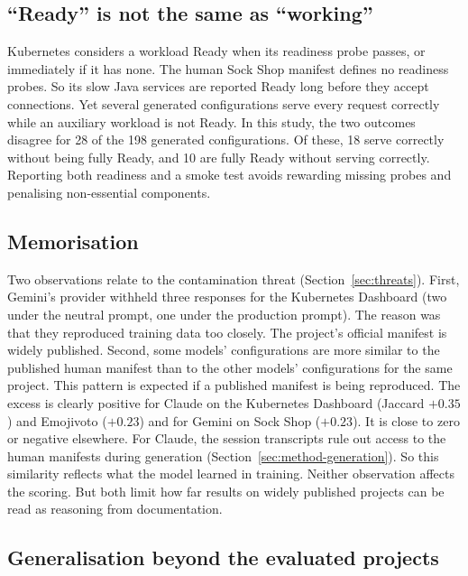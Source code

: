 \subsection{``Ready'' is not the same as ``working''}\label{sec:disc-ready}

Kubernetes considers a workload Ready when its readiness probe passes, or immediately if it has none. The human Sock Shop manifest defines no readiness probes. So its slow Java services are reported Ready long before they accept connections. Yet several generated configurations serve every request correctly while an auxiliary workload is not Ready. In this study, the two outcomes disagree for 28 of the 198 generated configurations. Of these, 18 serve correctly without being fully Ready, and 10 are fully Ready without serving correctly. Reporting both readiness and a smoke test avoids rewarding missing probes and penalising non-essential components.

\subsection{Memorisation}\label{sec:disc-memorisation}

Two observations relate to the contamination threat (Section~\ref{sec:threats}). First, Gemini's provider withheld three responses for the Kubernetes Dashboard (two under the neutral prompt, one under the production prompt). The reason was that they reproduced training data too closely. The project's official manifest is widely published. Second, some models' configurations are more similar to the published human manifest than to the other models' configurations for the same project. This pattern is expected if a published manifest is being reproduced. The excess is clearly positive for Claude on the Kubernetes Dashboard (Jaccard $+0.35$) and Emojivoto ($+0.23$) and for Gemini on Sock Shop ($+0.23$). It is close to zero or negative elsewhere. For Claude, the session transcripts rule out access to the human manifests during generation (Section~\ref{sec:method-generation}). So this similarity reflects what the model learned in training. Neither observation affects the scoring. But both limit how far results on widely published projects can be read as reasoning from documentation.

\subsection{Generalisation beyond the evaluated projects}\label{sec:disc-generalisation}

